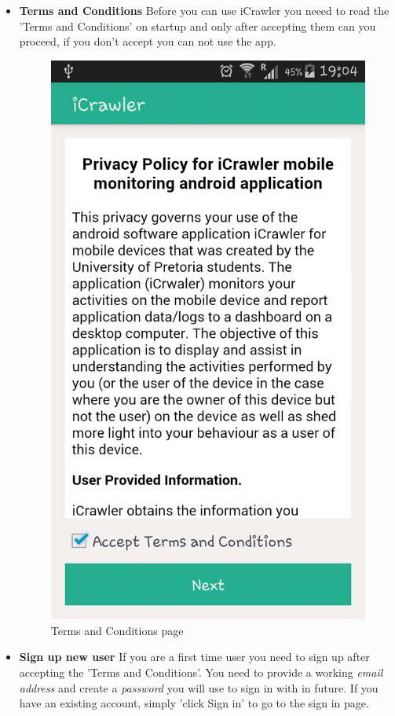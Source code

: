 \documentclass[hidelinks, 12pt, oneside]{article}
\begin{document}
	 \begin{itemize}
	 	\item \textbf{Terms and Conditions}\newline
	 	Before you can use iCrawler you neeed to read the 'Terms and Conditions' on startup and only 
	 	after accepting them can you proceed, if you don't accept you can not use the app.
	 	 
	 	 \begin{figure}[h!]
	 	 	\caption{Terms and Conditions page}
	 	 	\centering 																												\includegraphics[width=0.5 \textwidth]{img/tnc2.png}
	 	 \end{figure}\newpage
	 	 
	 	\item \textbf{Sign up new user}\newline
	 	If you are a first time user you need to sign up after accepting the 'Terms and Conditions'. You need
	 	to provide a working \emph{email address} and create a \emph{password} you will use to sign in with in future.
	 	If you have an existing account, simply 'click Sign in' to go to the sign in page.
	 	 

\end{itemize}
\end{document}
